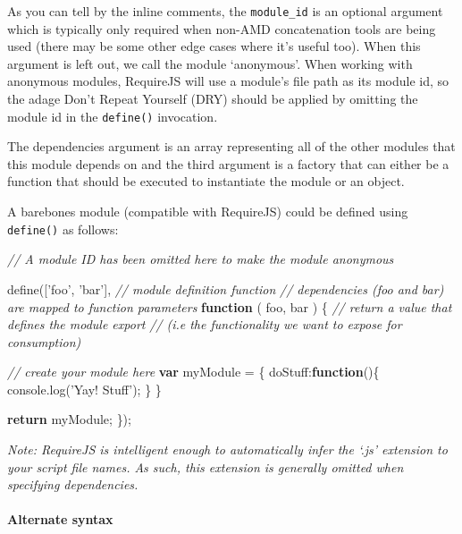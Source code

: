 \documentclass[9pt]{book}
\newenvironment{Shaded}{}{}
\newcommand{\KeywordTok}[1]{\textcolor[rgb]{0.00,0.44,0.13}{\textbf{{#1}}}}
\newcommand{\DataTypeTok}[1]{\textcolor[rgb]{0.56,0.13,0.00}{{#1}}}
\newcommand{\StringTok}[1]{\textcolor[rgb]{0.25,0.44,0.63}{{#1}}}
\newcommand{\CommentTok}[1]{\textcolor[rgb]{0.38,0.63,0.69}{\textit{{#1}}}}
\newcommand{\OtherTok}[1]{\textcolor[rgb]{0.00,0.44,0.13}{{#1}}}
\newcommand{\FunctionTok}[1]{\textcolor[rgb]{0.02,0.16,0.49}{{#1}}}
\newcommand{\NormalTok}[1]{{#1}}
\begin{document}
As you can tell by the inline comments, the \texttt{module\_id} is an
optional argument which is typically only required when non-AMD
concatenation tools are being used (there may be some other edge cases
where it's useful too). When this argument is left out, we call the
module `anonymous'. When working with anonymous modules, RequireJS will
use a module's file path as its module id, so the adage Don't Repeat
Yourself (DRY) should be applied by omitting the module id in the
\texttt{define()} invocation.

The dependencies argument is an array representing all of the other
modules that this module depends on and the third argument is a factory
that can either be a function that should be executed to instantiate the
module or an object.

A barebones module (compatible with RequireJS) could be defined using
\texttt{define()} as follows:

\begin{Shaded}
\begin{Highlighting}[]
\CommentTok{// A module ID has been omitted here to make the module anonymous}

\FunctionTok{define}\NormalTok{([}\StringTok{'foo'}\NormalTok{, }\StringTok{'bar'}\NormalTok{],}
    \CommentTok{// module definition function}
    \CommentTok{// dependencies (foo and bar) are mapped to function parameters}
    \KeywordTok{function} \NormalTok{( foo, bar ) \{}
        \CommentTok{// return a value that defines the module export}
        \CommentTok{// (i.e the functionality we want to expose for consumption)}

        \CommentTok{// create your module here}
        \KeywordTok{var} \NormalTok{myModule = \{}
            \DataTypeTok{doStuff}\NormalTok{:}\KeywordTok{function}\NormalTok{()\{}
                \OtherTok{console}\NormalTok{.}\FunctionTok{log}\NormalTok{(}\StringTok{'Yay! Stuff'}\NormalTok{);}
            \NormalTok{\}}
        \NormalTok{\}}

        \KeywordTok{return} \NormalTok{myModule;}
\NormalTok{\});}
\end{Highlighting}
\end{Shaded}

\emph{Note: RequireJS is intelligent enough to automatically infer the
`.js' extension to your script file names. As such, this extension is
generally omitted when specifying dependencies.}

\paragraph{Alternate syntax}\label{alternate-syntax}
\end{document}
